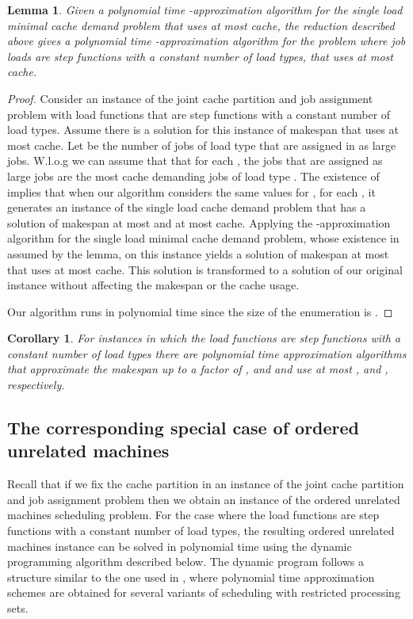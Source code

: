 \documentclass[11pt]{article}
\newtheorem{corollary}[theorem]{Corollary}
\newtheorem{lemma}[theorem]{Lemma}
\begin{document}
\begin{lemma}
Given a polynomial time -approximation algorithm for the single load minimal cache demand problem that uses at most  cache, the reduction described above gives a polynomial time -approximation algorithm for the problem  where job loads are step functions with a constant number of load types, that uses at most  cache.
\end{lemma}
\begin{proof}
Consider an instance of the joint cache partition and job assignment problem with load functions that are step functions with a constant number of load types.
Assume there is a solution  for this instance of makespan  that uses at most  cache. Let  be the number of jobs of load type  that are assigned in  as large jobs. W.l.o.g we can assume that that for each , the  jobs that are assigned as large jobs are the  most cache demanding jobs of load type . The existence of  implies that when our algorithm considers the same values for , for each , it generates an instance of the single load cache demand problem that has a solution of makespan at most  and at most  cache.
Applying the -approximation algorithm for the single load minimal cache demand problem, whose existence in assumed by the lemma, on this instance yields a solution of makespan at most  that uses at most  cache. This solution is transformed to a solution of our original instance without affecting the makespan or the cache usage.

Our algorithm runs in polynomial time since the size of the enumeration is .
\end{proof}

\begin{corollary}
For instances in which the load functions are step functions with a constant number of load types there are polynomial time approximation algorithms that approximate the makespan up to a factor of ,  and  and use at most ,  and , respectively.
\end{corollary}

\subsection{The corresponding special case of ordered unrelated
machines}\label{apn_const} Recall that if we fix the cache partition
in an instance of the joint cache partition and job assignment
problem then we obtain an instance of the ordered unrelated machines
scheduling problem. For the case where the load functions are step
functions with a constant number of load types, the resulting
ordered unrelated machines instance can be solved in polynomial time
using the dynamic programming algorithm described below. The dynamic
program follows a structure similar to the one used in \cite{leah},
where polynomial time approximation schemes are obtained for several
variants of scheduling with restricted processing sets.
\end{document}
